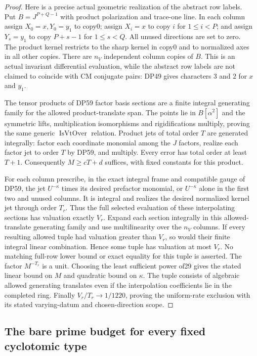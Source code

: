 \documentclass[11pt,a4paper]{article}
\theoremstyle{definition}\newtheorem{remark}[theorem]{Remark}
\begin{document}
\begin{proof}
Here is a precise actual geometric realization of the abstract row
labels. Put $B=J^{P+Q-1}$ with product polarization and trace-one line.
In each column assign $X_0=x,Y_0=y_1$ to copy0; assign $X_i=x$ to
copy $i$ for $1\le i<P$; and assign $Y_s=y_1$ to copy $P+s-1$ for
$1\le s<Q$. All unused directions are set to zero. The product kernel
restricts to the sharp kernel in copy0 and to normalized axes in all
other copies. There are $n_V$ independent column copies of $B$.
This is an actual invariant differential evaluation, while the abstract
row labels are not claimed to coincide with CM conjugate pairs:
DP49 gives characters $3$ and $2$ for $x$ and $y_1$.

The tensor products of DP59 factor basis sections are a finite integral
generating family for the allowed product-translate span. The points lie in $B[\alpha^2]$ and the symmetric lifts,
multiplication isomorphisms and rigidifications multiply, proving the
same generic $\operatorname{IsVtOver}$ relation. Product jets of total
order $T$ are generated integrally: factor each coordinate monomial
among the $J$ factors, realize each factor jet to order $T$ by DP59,
and multiply. Every error has total order at least $T+1$.
Consequently $M\ge cT+d$ suffices, with fixed constants for this product.

For each column prescribe, in the exact integral frame and compatible
gauge of DP59, the jet $U^{-\kappa}$ times its desired prefactor
monomial, or $U^{-\kappa}$ alone in the first two and unused columns.
It is integral and realizes the desired normalized kernel jet through
order $T_r$. Thus the full selected evaluation of these interpolating
sections has valuation exactly $V_r$. Expand each section integrally
in this allowed-translate generating family and use multilinearity over the $n_V$
columns. If every resulting allowed tuple had valuation greater than
$V_r$, so would their finite integral linear combination. Hence some
tuple has valuation at most $V_r$. No matching full-row lower bound or
exact equality for this tuple is asserted. The factor $M^{-T_r}$ is a
unit. Choosing the least sufficient power of29 gives the stated
linear bound on $M$ and quadratic bound on $\kappa$.
The tuple consists of algebraic allowed generating translates even if the
interpolation coefficients lie in the completed ring.
Finally $V_r/T_r\to1/1220$, proving the uniform-rate exclusion with
its stated varying-datum and chosen-direction scope.
\end{proof}


\subsection{The bare prime budget for every fixed cyclotomic type}
\end{document}
